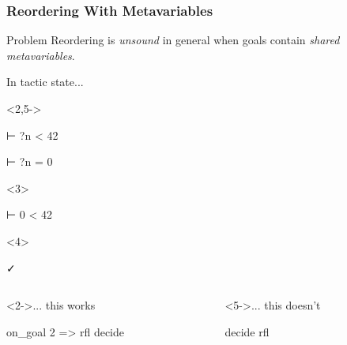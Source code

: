 \begin{frame}[fragile]
  \frametitle{Reordering With Metavariables}

  \begin{block}{Problem}
    Reordering is \emph{unsound} in general when goals contain \emph{shared metavariables}.
  \end{block}

  \pause

  \begin{block}{In tactic state...}
    \begin{onlyenv}<2,5->
      \begin{leancode}
        ⊢ ?n < 42

        ⊢ ?n = 0
      \end{leancode}
    \end{onlyenv}
    \begin{onlyenv}<3>
      \begin{leancode}
        ⊢ 0 < 42


      \end{leancode}
    \end{onlyenv}
    \begin{onlyenv}<4>
      \begin{leancode}
        ✓


      \end{leancode}
    \end{onlyenv}
  \end{block}

  \begin{columns}[onlytextwidth]
    \begin{column}{.45\textwidth}
      \begin{block}<2->{... this works}
        \begin{leancode}
          on_goal 2 => rfl
          decide
        \end{leancode}
      \end{block}
    \end{column}

    \begin{column}{.45\textwidth}
      \begin{block}<5->{... this doesn't}
        \begin{leancode}
          decide
          rfl
        \end{leancode}
      \end{block}
    \end{column}
  \end{columns}
\end{frame}

